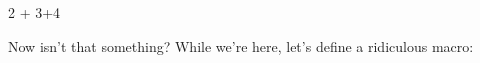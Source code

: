 2 +
3+4

Now isn't that something? While we're here, let's define a ridiculous macro:

\def\openmath#1{$#1}
